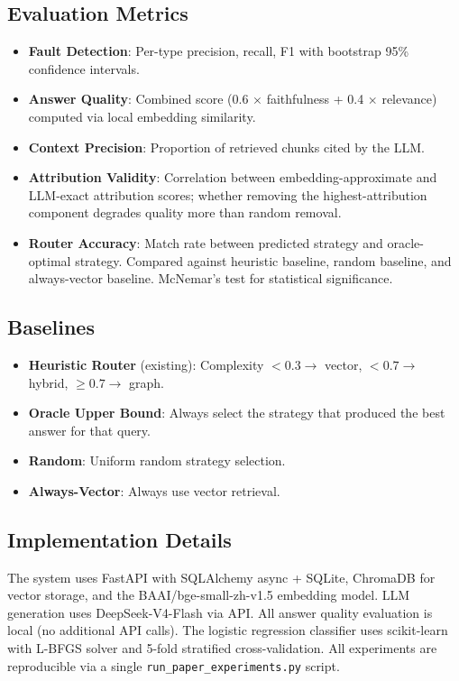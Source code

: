 \documentclass[11pt,a4paper]{article}
\begin{document}
\subsection{Evaluation Metrics}

\begin{itemize}[leftmargin=*,itemsep=1pt]
\item \textbf{Fault Detection}: Per-type precision, recall, F1 with bootstrap 95\% confidence intervals.
\item \textbf{Answer Quality}: Combined score (0.6 $\times$ faithfulness + 0.4 $\times$ relevance) computed via local embedding similarity.
\item \textbf{Context Precision}: Proportion of retrieved chunks cited by the LLM.
\item \textbf{Attribution Validity}: Correlation between embedding-approximate and LLM-exact attribution scores; whether removing the highest-attribution component degrades quality more than random removal.
\item \textbf{Router Accuracy}: Match rate between predicted strategy and oracle-optimal strategy. Compared against heuristic baseline, random baseline, and always-vector baseline. McNemar's test for statistical significance.
\end{itemize}

\subsection{Baselines}

\begin{itemize}[leftmargin=*,itemsep=1pt]
\item \textbf{Heuristic Router} (existing): Complexity $< 0.3 \rightarrow$ vector, $< 0.7 \rightarrow$ hybrid, $\geq 0.7 \rightarrow$ graph.
\item \textbf{Oracle Upper Bound}: Always select the strategy that produced the best answer for that query.
\item \textbf{Random}: Uniform random strategy selection.
\item \textbf{Always-Vector}: Always use vector retrieval.
\end{itemize}

\subsection{Implementation Details}

The system uses FastAPI with SQLAlchemy async + SQLite, ChromaDB for vector storage, and the BAAI/bge-small-zh-v1.5 embedding model. LLM generation uses DeepSeek-V4-Flash via API. All answer quality evaluation is local (no additional API calls). The logistic regression classifier uses scikit-learn with L-BFGS solver and 5-fold stratified cross-validation. All experiments are reproducible via a single \texttt{run\_paper\_experiments.py} script.
\end{document}

